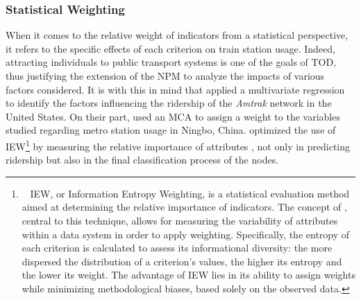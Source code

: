 \begin{refsegment}
\subsubsection*{Statistical Weighting
    \label{chap6:ponderation-objective}
    }

When it comes to the relative weight of indicators from a statistical perspective, it refers to the specific effects of each criterion on train station usage. Indeed, attracting individuals to public transport systems is one of the goals of \acrshort{TOD}, thus justifying the extension of the \acrshort{NPM} to analyze the impacts of various factors considered. It is with this in mind that \textcolor{blue}{\textcite[2]{cummings_does_2022}} applied a multivariate regression to identify the factors influencing the ridership of the \textsl{Amtrak} network in the United States. On their part, \textcolor{blue}{\textcite[248]{yang_tod_2021}} used an \acrfull{MCA} to assign a weight to the variables studied regarding metro station usage in Ningbo, China. \textcolor{blue}{\textcite[4]{amini_pishro_integrated_2023}} optimized the use of \acrfull{IEW}\footnote{~
    \acrfull{IEW}, or Information Entropy Weighting, is a statistical evaluation method aimed at determining the relative importance of indicators. The concept of , central to this technique, allows for measuring the variability of attributes within a data system in order to apply weighting. Specifically, the entropy of each criterion is calculated to assess its informational diversity: the more dispersed the distribution of a criterion's values, the higher its entropy and the lower its weight. The advantage of \acrshort{IEW} lies in its ability to assign weights while minimizing methodological biases, based solely on the observed data.
} by measuring the relative importance of attributes \textcolor{blue}{\autocite[4]{shannon_mathematical_1948}}, not only in predicting ridership but also in the final classification process of the nodes. %


\end{refsegment}
